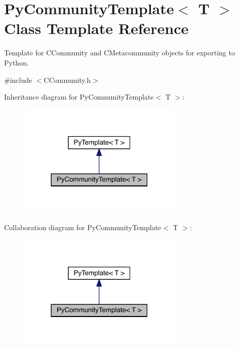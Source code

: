 \hypertarget{class_py_community_template}{}\section{Py\+Community\+Template$<$ T $>$ Class Template Reference}
\label{class_py_community_template}


Template for C\+Community and C\+Metacommunity objects for exporting to Python.  




{\ttfamily \#include $<$C\+Community.\+h$>$}



Inheritance diagram for Py\+Community\+Template$<$ T $>$\+:
\nopagebreak
\begin{figure}[H]
\begin{center}
\leavevmode
\includegraphics[width=222pt]{class_py_community_template__inherit__graph}
\end{center}
\end{figure}


Collaboration diagram for Py\+Community\+Template$<$ T $>$\+:
\nopagebreak
\begin{figure}[H]
\begin{center}
\leavevmode
\includegraphics[width=222pt]{class_py_community_template__coll__graph}
\end{center}
\end{figure}
